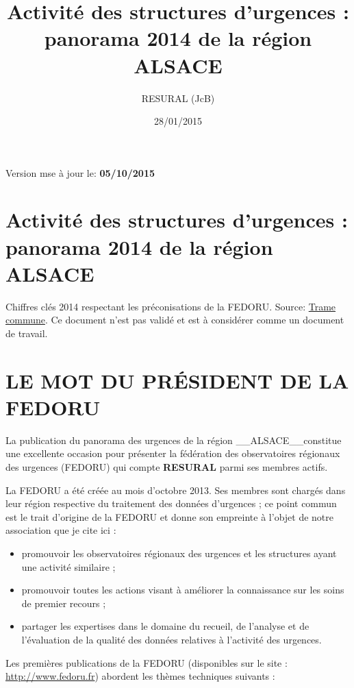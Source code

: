 \documentclass[]{article}
\title{Activité des structures d'urgences : panorama 2014 de la région ALSACE}
\author{RESURAL (JcB)}
\date{28/01/2015}
\begin{document}
\maketitle


{
\hypersetup{linkcolor=black}
\setcounter{tocdepth}{3}
\tableofcontents
}
Version mse à jour le: \textbf{05/10/2015}

\section{Activité des structures d'urgences : panorama 2014 de la région
ALSACE}\label{activite-des-structures-durgences-panorama-2014-de-la-region-alsace}

Chiffres clés 2014 respectant les préconisations de la FEDORU. Source:
\href{https://docs.google.com/document/d/101LYVqVLeHZnrujfMm3aqBYfbOwx3CPEB3Y-Lbud2Ls/edit}{Trame
commune}. Ce document n'est pas validé et est à considérer comme un
document de travail.

\section{LE MOT DU PRÉSIDENT DE LA
FEDORU}\label{le-mot-du-president-de-la-fedoru}

La publication du panorama des urgences de la région
\_\_ALSACE\_\_constitue une excellente occasion pour présenter la
fédération des observatoires régionaux des urgences (FEDORU) qui compte
\textbf{RESURAL} parmi ses membres actifs.

La FEDORU a été créée au mois d'octobre 2013. Ses membres sont chargés
dans leur région respective du traitement des données d'urgences ; ce
point commun est le trait d'origine de la FEDORU et donne son empreinte
à l'objet de notre association que je cite ici :

\begin{itemize}
\itemsep1pt\parskip0pt
\item
  promouvoir les observatoires régionaux des urgences et les structures
  ayant une activité similaire ;
\item
  promouvoir toutes les actions visant à améliorer la connaissance sur
  les soins de premier recours ;
\item
  partager les expertises dans le domaine du recueil, de l'analyse et de
  l'évaluation de la qualité des données relatives à l'activité des
  urgences.
\end{itemize}

Les premières publications de la FEDORU (disponibles sur le site :
\url{http://www.fedoru.fr}) abordent les thèmes techniques suivants :
\end{document}
